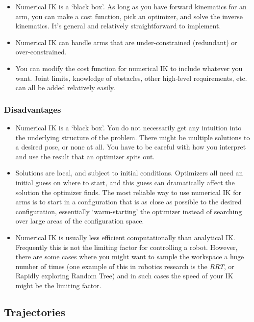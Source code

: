 \documentclass{16384_doc}
\begin{document}
\begin{itemize}
\item Numerical IK is a ‘black box’.  As long as you have forward kinematics for
an arm, you can make a cost function, pick an optimizer, and solve the inverse
kinematics.  It's general and relatively straightforward to implement.
\item Numerical IK can handle arms that are under-constrained (redundant) or
over-constrained.
\item You can modify the cost function for numerical IK to include whatever you
want.  Joint limits, knowledge of obstacles, other high-level requirements, etc.
can all be added relatively easily.
\end{itemize}

\subsubsection{Disadvantages}
\begin{itemize}
\item Numerical IK is a ‘black box’.  You do not necessarily get any intuition
into the underlying structure of the problem.  There might be multiple solutions
to a desired pose, or none at all.  You have to be careful with how you
interpret and use the result that an optimizer spits out.
\item Solutions are local, and subject to initial conditions.  Optimizers all
need an initial guess on where to start, and this guess can dramatically affect
the solution the optimizer finds.  The most reliable way to use numerical IK for
arms is to start in a configuration that is as close as possible to the desired
configuration, essentially ‘warm-starting’ the optimizer instead of searching
over large areas of the configuration space.
\item Numerical IK is usually less efficient computationally than analytical IK.
Frequently this is not the limiting factor for controlling a robot.  However,
there are some cases where you might want to sample the workspace a huge number
of times (one example of this in robotics research is the \emph{RRT}, or Rapidly
exploring Random Tree) and in such cases the speed of your IK might be the
limiting factor.
\end{itemize}

\subsection{Trajectories}
\end{document}
